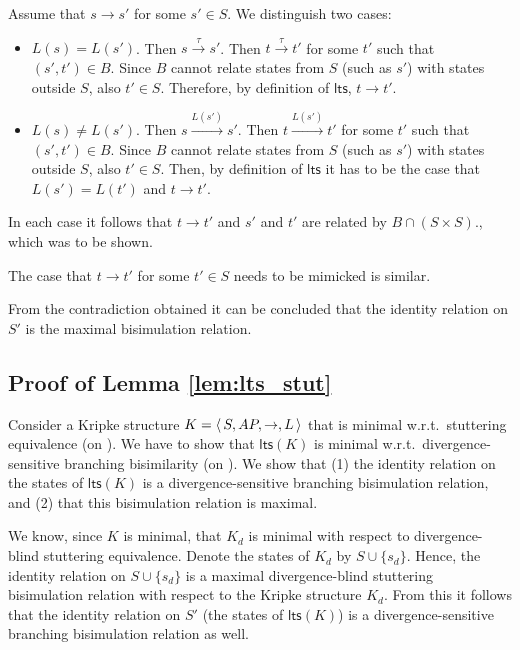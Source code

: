 \documentclass{llncs}
\newcommand{\ltstrans}[1]{\xrightarrow{#1}}
\newcommand{\kstrans}{\to}
\newcommand{\lts}{\mathsf{lts}}
\begin{document}
 Assume that $s \kstrans s'$ for some $s'\in S$. We distinguish two cases:
 \begin{itemize}
 \item $L(s) = L(s')$. Then $s \ltstrans{\tau} s'$. Then $t \ltstrans{\tau} t'$ for some $t'$ such that $(s',t') \in B$. Since $B$ cannot relate states from $S$ (such as $s'$) with states outside $S$, also $t'\in S$. Therefore, by definition of $\lts$, $t \kstrans t'$.
 \item  $L(s) \neq L(s')$. Then $s \ltstrans{L(s')} s'$. Then $t \ltstrans{L(s')} t'$ for some $t'$ such that $(s',t') \in B$. Since $B$ cannot relate states from $S$ (such as $s'$) with states outside $S$, also $t'\in S$. Then, by definition of $\lts$ it has to be the case that $L(s') = L(t')$ and $t \kstrans t'$.
 \end{itemize}
 In each case it follows that $t \kstrans t'$ and $s'$ and $t'$ are related by $B \cap (S \times S)$., which was to be shown.

The case that $t \kstrans t'$ for some $t'\in S$ needs to be mimicked is similar.

From the contradiction obtained it can be concluded that the identity relation on $S'$ is the maximal bisimulation relation.


\subsection{Proof of Lemma \ref{lem:lts_stut}}
\label{pf:lem:lts_stut}

Consider a Kripke structure $K = \tuple{S,AP,\kstrans,L}$ that is minimal w.r.t.\ stuttering equivalence (on \KS). We have to show that $\lts(K)$ is minimal w.r.t.\ divergence-sensitive branching bisimilarity (on \LTS). We show that (1) the identity relation on the states of $\lts(K)$ is a divergence-sensitive branching bisimulation relation, and (2) that this bisimulation relation is maximal.

We know, since $K$ is minimal, that $K_d$ is minimal with respect to
divergence-blind stuttering equivalence. Denote the states of $K_d$ by
$S \cup \{ s_d\}$. Hence, the identity relation on $S\cup\{s_d\}$ is a
maximal divergence-blind stuttering bisimulation relation with respect
to the Kripke structure $K_d$. From this it follows that the identity
relation on $S'$ (the states of $\lts(K)$) is a divergence-sensitive
branching bisimulation relation as well.
\end{document}
